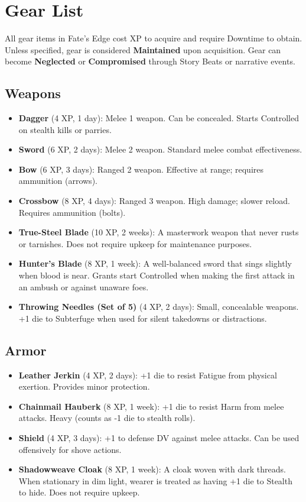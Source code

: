 \documentclass[12pt]{article}
\begin{document}
\section*{Gear List}

All gear items in Fate's Edge cost XP to acquire and require Downtime to obtain. Unless specified, gear is considered \textbf{Maintained} upon acquisition. Gear can become \textbf{Neglected} or \textbf{Compromised} through Story Beats or narrative events.

\subsection*{Weapons}

\begin{itemize}[leftmargin=*]
  \item \textbf{Dagger} (4 XP, 1 day): Melee 1 weapon. Can be concealed. Starts Controlled on stealth kills or parries.
  \item \textbf{Sword} (6 XP, 2 days): Melee 2 weapon. Standard melee combat effectiveness.
  \item \textbf{Bow} (6 XP, 3 days): Ranged 2 weapon. Effective at range; requires ammunition (arrows).
  \item \textbf{Crossbow} (8 XP, 4 days): Ranged 3 weapon. High damage; slower reload. Requires ammunition (bolts).
  \item \textbf{True-Steel Blade} (10 XP, 2 weeks): A masterwork weapon that never rusts or tarnishes. Does not require upkeep for maintenance purposes.
  \item \textbf{Hunter's Blade} (8 XP, 1 week): A well-balanced sword that sings slightly when blood is near. Grants start Controlled when making the first attack in an ambush or against unaware foes.
  \item \textbf{Throwing Needles (Set of 5)} (4 XP, 2 days): Small, concealable weapons. +1 die to Subterfuge when used for silent takedowns or distractions.
\end{itemize}

\subsection*{Armor}

\begin{itemize}[leftmargin=*]
  \item \textbf{Leather Jerkin} (4 XP, 2 days): +1 die to resist Fatigue from physical exertion. Provides minor protection.
  \item \textbf{Chainmail Hauberk} (8 XP, 1 week): +1 die to resist Harm from melee attacks. Heavy (counts as -1 die to stealth rolls).
  \item \textbf{Shield} (4 XP, 3 days): +1 to defense DV against melee attacks. Can be used offensively for shove actions.
  \item \textbf{Shadowweave Cloak} (8 XP, 1 week): A cloak woven with dark threads. When stationary in dim light, wearer is treated as having +1 die to Stealth to hide. Does not require upkeep.
\end{itemize}
\end{document}
